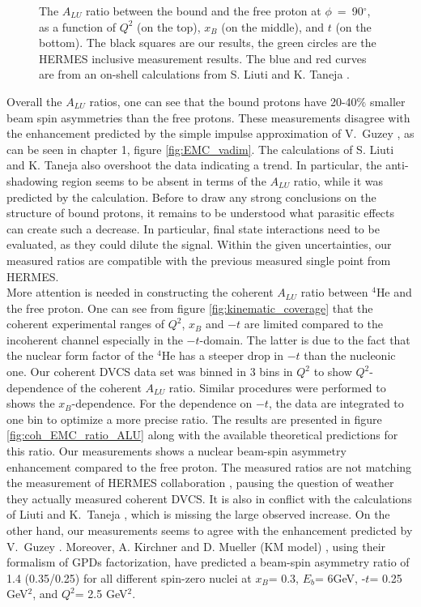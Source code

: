 \begin{figure}[tp]
\caption{ The $A_{LU}$ ratio between the bound and the free proton at 
$\phi$~=~90$^{\circ}$, as a function of $Q^2$ (on the top), $x_B$ (on the 
middle), and $t$ (on the bottom). The black squares are our results, the 
green circles are the HERMES inclusive measurement \cite{HERMES_BSA} results. 
The blue and red curves are from an on-shell calculations from S. Liuti and K. Taneja 
\cite{simonetta_2}.} \label{fig:incoh_EMC_ratio_ALU_proton}
\end{figure}

Overall the $A_{LU}$ ratios, one can see that the bound protons 
have 20-40$\%$ smaller beam spin asymmetries than the free protons. These measurements 
disagree with the enhancement predicted by the simple impulse approximation of 
V.~Guzey \cite{EMC_vadim_2}, as can be seen in chapter 1, figure 
\ref{fig:EMC_vadim}. The calculations of S. Liuti and K. Taneja \cite{simonetta_2}
also overshoot the data indicating a trend. In particular, the 
anti-shadowing region seems to be absent in terms of the $A_{LU}$ ratio, while
it was predicted by the calculation. Before to draw any strong conclusions on the 
structure of bound protons, it remains to be understood what parasitic
effects can create such a decrease. In particular, final state interactions need
to be evaluated, as they could dilute the signal.  Within the given 
uncertainties, our measured ratios are compatible with the previous measured 
single point from HERMES.\\


 More attention is needed in constructing the coherent $A_{LU}$ ratio between 
 $^4$He and the free proton. One can see from figure 
 \ref{fig:kinematic_coverage} that the coherent experimental ranges of $Q^2$, 
 $x_{B}$ and $-t$ are limited compared to the incoherent channel especially in 
 the $-t$-domain. The latter is due to the fact that the nuclear form factor of 
 the $^4$He has a steeper drop in $-t$ than the nucleonic one. Our coherent 
 DVCS data set was binned in 3 bins in $Q^{2}$ to show
 $Q^{2}$-dependence of the coherent $A_{LU}$ ratio.  Similar procedures were 
 performed to shows the $x_B$-dependence. For the dependence on $-t$, the data 
 are integrated to one bin to optimize a more precise ratio. The results are 
 presented in figure \ref{fig:coh_EMC_ratio_ALU} along with the available 
 theoretical predictions for this ratio. Our measurements shows a nuclear 
 beam-spin asymmetry enhancement compared to the free proton. 
 The measured ratios are not matching the measurement of 
 HERMES collaboration \cite{HERMES_BSA}, pausing the question of weather they
 actually measured coherent DVCS. It is also in conflict with the calculations 
 of Liuti and K.~Taneja \cite{simonetta_2}, which is missing the large observed 
 increase. On the other hand, our measurements seems to agree with the 
 enhancement predicted by V.~Guzey \cite{EMC_vadim_4}.  Moreover, A.  Kirchner 
 and D. Mueller (KM model) \cite{Kir}, using their formalism of GPDs 
 factorization, have predicted a beam-spin asymmetry ratio of 1.4 (0.35/0.25) 
 for all different spin-zero nuclei at $x_{B}$= 0.3, $E_{b}$= 6GeV, -$t$= 0.25 
 GeV$^2$, and $Q^2$= 2.5 GeV$^2$.  \\



